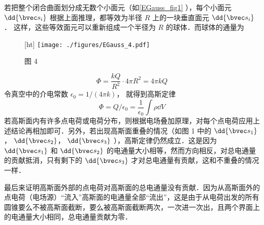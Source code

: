 若把整个闭合曲面划分成无数个小面元（如\autoref{EGauss_fig1} ），每个小面元 $\dd{\bvec s_i}$ 根据上面推理，都等效为半径 $R$ 上的一块垂直面元 $\dd{\bvec s_i}$． 这样，这些等效面元可以重新组成一个半径为 $R$ 的球体．而球体的通量为
\begin{figure}\label{EGauss_fig1}[ht]
\centering
\texttt{[image: ./figures/EGauss\_4.pdf]}
\caption{图 4}
\end{figure}

\begin{equation}
\Phi  = \frac{kQ}{R^2} \cdot 4\pi R^2 = 4\pi kQ
\end{equation} 
令真空中的介电常数 $\epsilon_0 = 1/(4\pi k)$， 就得到高斯定律
\begin{equation}
\Phi  = Q/\epsilon_0 = \frac{1}{\epsilon_0} \int \rho \dd{V}
\end{equation} 
若高斯面内有许多点电荷或电荷分布，则根据电场叠加原理，对每个点电荷应用上述结论再相加即可．另外，若出现高斯面重叠的情况（如图 1 中的 $\dd{\bvec s_1}$，  $\dd{\bvec s_2}$，  $\dd{\bvec s_3}$ ），高斯定律仍然成立．这是因为 $\dd{\bvec s_1}$ 和 $\dd{\bvec s_2}$ 的电通量大小相等，然而方向相反，对总电通量的贡献抵消，只有剩下的 $\dd{\bvec s_3}$ 才对总电通量有贡献，这和不重叠的情况一样．

最后来证明高斯面外部的点电荷对高斯面的总电通量没有贡献．因为从高斯面外的点电荷（电场源）“流入”高斯面的电通量全部“流出”，这是由于从电荷出发的所有圆锥要么不被高斯面截断，要么被高斯面截断两次，一次进一次出，且两个界面上的电通量大小相同，总电通量贡献为零．
 